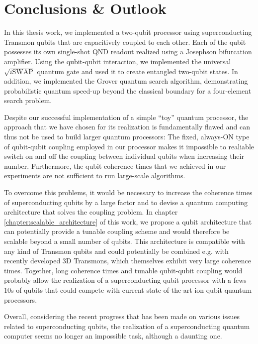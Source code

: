 \chapter{Conclusions \& Outlook} \label{chapter:conclusions}

In this thesis work, we implemented a two-qubit processor using superconducting Transmon qubits that are capacitively coupled to each other. Each of the qubit possesses its own single-shot QND readout realized using a Josephson bifurcation amplifier. Using the qubit-qubit interaction, we implemented the universal $\sqrt{i\mathrm{SWAP}}$ quantum gate and used it to create entangled two-qubit states. In addition, we implemented the Grover quantum search algorithm, demonstrating probabilistic quantum speed-up beyond the classical boundary for a four-element search problem.

\smallskip

Despite our successful implementation of a simple ``toy'' quantum processor, the approach that we have chosen for its realization is fundamentally flawed and can thus not be used to build larger quantum processors: The fixed, always-ON type of qubit-qubit coupling employed in our processor makes it impossible to realiable switch on and off the coupling between individual qubits when increasing their number. Furthermore, the qubit coherence times that we achieved in our experiments are not sufficient to run large-scale algorithms.

\smallskip

To overcome this problems, it would be necessary to increase the coherence times of superconducting qubits by a large factor and to devise a quantum computing architecture that solves the coupling problem. In chapter \ref{chapter:scalable_architecture} of this work, we propose a qubit architecture that can potentially provide a tunable coupling scheme and would therefore be scalable beyond a small number of qubits. This architecture is compatible with any kind of Transmon qubits and could potentially be combined e.g. with recently developed 3D Transmons, which themselves exhibit very large coherence times. Together, long coherence times and tunable qubit-qubit coupling would probably allow the realization of a superconducting qubit processor with a fews 10s of qubits that could compete with current state-of-the-art ion qubit quantum processors. 

\smallskip

Overall, considering the recent progress that has been made on various issues related to superconducting qubits, the realization of a superconducting quantum computer seems no longer an impossible task, although a daunting one.